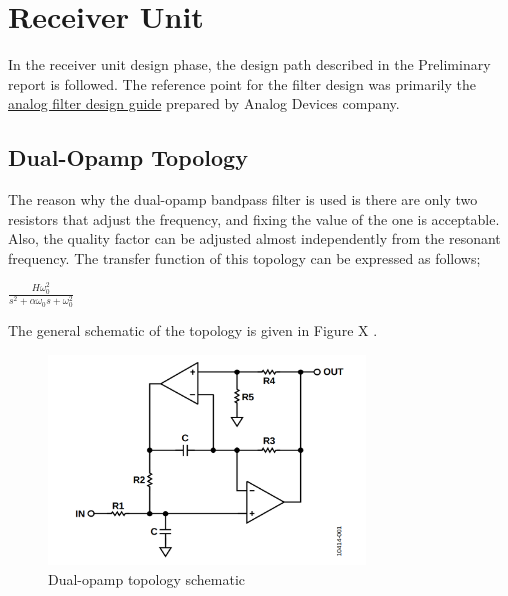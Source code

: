 \documentclass[letterpaper,12pt]{article}
\begin{document}
\section{Receiver Unit}
In the receiver unit design phase, the design path described in the Preliminary report is followed. The reference point for the filter design was primarily the \href{https://www.analog.com/media/en/training-seminars/design-handbooks/basic-linear-design/chapter8.pdf}{analog filter design guide} prepared by Analog Devices company.
\subsection{Dual-Opamp Topology}
The reason why the dual-opamp bandpass filter is used is there are only two resistors that adjust the frequency, and fixing the value of the one is acceptable. Also, the quality factor can be adjusted almost independently from the resonant frequency. The transfer function of this topology can be expressed as follows;
\begin{center}
    $ \frac{H \omega_0^2 }{s^2 + \alpha \omega_0 s + \omega_0 ^2} $
    
\end{center}
The general schematic of the topology is given in Figure X .
\begin{figure}[H]
    \centering
    \includegraphics[width = 0.75\textwidth]{dualopamp.png}
    \caption{Dual-opamp topology schematic}
\end{figure} 
\end{document}
